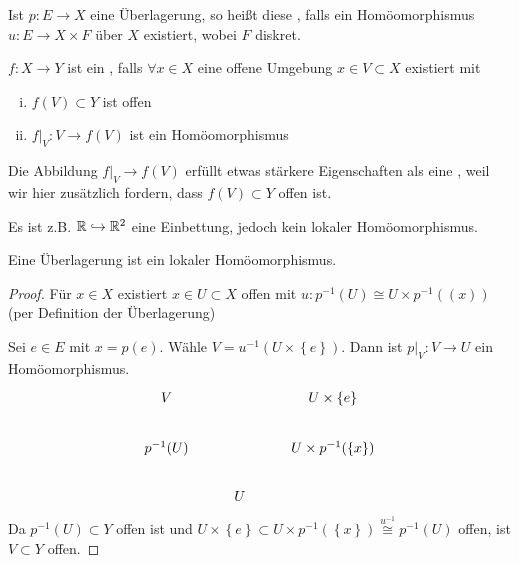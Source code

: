 \begin{remark}
    Ist $p\colon  E \to  X$ eine Überlagerung, so heißt diese , falls ein Homöomorphismus $u\colon  E \to  X\times F$ über $X$ existiert, wobei  $F$ diskret.
\end{remark}

\begin{definition}
    $f\colon X \to  Y$ ist ein , falls $\forall x\in X$ eine offene Umgebung $x\in V \subset X$ existiert mit
    \begin{enumerate}[i)]
        \item $f(V)\subset Y$ ist offen
        \item $f|_V\colon  V \to  f(V)$ ist ein Homöomorphismus
    \end{enumerate}
\end{definition}

\begin{oral}
    Die Abbildung $f|_V \to  f(V)$ erfüllt etwas stärkere Eigenschaften als eine , weil wir hier zusätzlich fordern, dass $f(V)\subset Y$ offen ist.

    Es ist z.B. $\mathbb{R} \hookrightarrow \mathbb{R}^2$ eine Einbettung, jedoch kein lokaler Homöomorphismus.
\end{oral}

\begin{lemma}\label{lm:überlagerung-ist-lokaler-homöomorphismus}
    Eine Überlagerung ist ein lokaler Homöomorphismus.
\end{lemma}

\begin{proof}
    Für $x\in X$ existiert $x\in U\subset X$ offen mit $u\colon p^{-1} (U) \cong U\times p^{-1} ((x))$ (per Definition der Überlagerung) 

    Sei $e\in E$ mit $x = p(e)$. Wähle  $V = u^{-1}(U\times \left \{e\right\} )$. Dann ist $p|_V \colon  V \to  U$ ein Homöomorphismus.
\[
    \begin{tikzcd}
        V & &U \times \left \{e\right\} \\
        p^{-1} (U) & &U\times p^{-1} (\left \{x\right\} ) \\
                   & U 
    \end{tikzcd}
\]
Da $p^{-1} (U)\subset Y$ offen ist und $U\times \left \{e\right\} \subset U\times p^{-1} (\left \{x\right\} ) \stackrel{u^{-1}}{\cong} p^{-1} (U)$ offen, ist $V\subset Y$ offen.
\end{proof}

